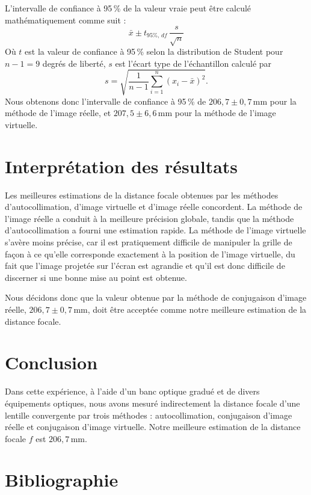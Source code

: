 \documentclass[a4paper,11pt]{article}
\begin{document}
L'intervalle de confiance à 95\,\% de la valeur vraie peut être calculé mathématiquement comme suit :
\[
  \bar{x} \pm t_{95\%,\,df}\,\frac{s}{\sqrt{n}}
\]
Où $t$ est la valeur de confiance à 95\,\% selon la distribution de Student pour $n-1=9$ degrés de liberté, $s$ est l'écart type de l'échantillon calculé par
\[
  s = \sqrt{\frac{1}{n-1}\sum_{i=1}^{n}(x_i-\bar{x})^2}.
\]
Nous obtenons donc l'intervalle de confiance à 95\,\% de $206{,}7 \pm 0{,}7$\,mm pour la méthode de l'image réelle, et $207{,}5 \pm 6{,}6$\,mm pour la méthode de l'image virtuelle.

\section{Interprétation des résultats}

Les meilleures estimations de la distance focale obtenues par les méthodes d'autocollimation, d'image virtuelle et d'image réelle concordent. La méthode de l'image réelle a conduit à la meilleure précision globale, tandis que la méthode d'autocollimation a fourni une estimation rapide. La méthode de l'image virtuelle s'avère moins précise, car il est pratiquement difficile de manipuler la grille de façon à ce qu'elle corresponde exactement à la position de l'image virtuelle, du fait que l'image projetée sur l'écran est agrandie et qu'il est donc difficile de discerner si une bonne mise au point est obtenue.

Nous décidons donc que la valeur obtenue par la méthode de conjugaison d'image réelle, $206{,}7 \pm 0{,}7$\,mm, doit être acceptée comme notre meilleure estimation de la distance focale.

\section{Conclusion}

Dans cette expérience, à l'aide d'un banc optique gradué et de divers équipements optiques, nous avons mesuré indirectement la distance focale d'une lentille convergente par trois méthodes : autocollimation, conjugaison d'image réelle et conjugaison d'image virtuelle. Notre meilleure estimation de la distance focale $f$ est $206{,}7$\,mm.

\section*{Bibliographie}
\end{document}
